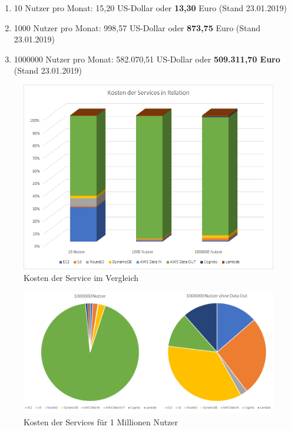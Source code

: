 \documentclass[a4paper, 12pt]{scrreprt}
\renewcommand\_{\textunderscore\allowbreak}
\begin{document}
\begin{enumerate}
	\item 10 Nutzer pro Monat: 15,20 US-Dollar oder \textbf{13,30} Euro (Stand 23.01.2019)
	\item 1000 Nutzer pro Monat: 998,57 US-Dollar oder \textbf{873,75} Euro (Stand 23.01.2019)
	\item 1000000 Nutzer pro Monat: 582.070,51 US-Dollar oder \textbf{509.311,70 Euro} (Stand 23.01.2019) 
\end{enumerate}

\begin{figure}[H]
\centering
\includegraphics[scale=0.8]{costs-overview.png}
\caption{Kosten der Service im Vergleich}
\end{figure}

\begin{figure}[H]
\centering
\includegraphics[scale=0.75]{million-costs.png}
\caption{Kosten der Services für 1 Millionen Nutzer}
\end{figure}
\end{document}
